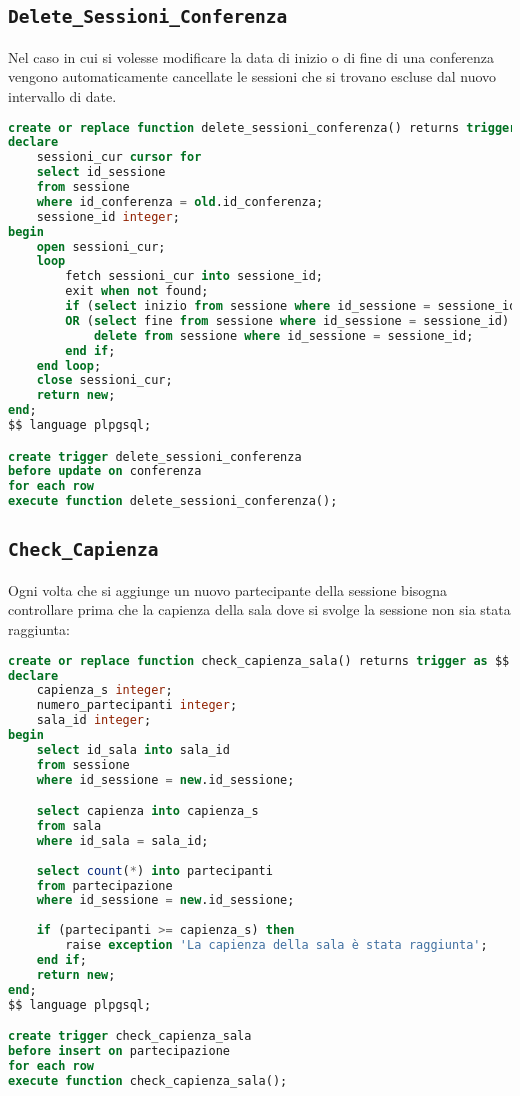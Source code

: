 \subsection{\texttt{Delete\_Sessioni\_Conferenza}}
Nel caso in cui si volesse modificare la data di inizio o di fine di una conferenza vengono automaticamente cancellate le sessioni che si trovano escluse dal nuovo intervallo di date.
\begin{lstlisting}[language=SQL, style=mystyle, caption={\texttt{Delete\_sessioni\_conferenza}}]
create or replace function delete_sessioni_conferenza() returns trigger as $$
declare
    sessioni_cur cursor for 
    select id_sessione 
    from sessione 
    where id_conferenza = old.id_conferenza;
    sessione_id integer;
begin
    open sessioni_cur;
    loop
        fetch sessioni_cur into sessione_id;
        exit when not found;
        if (select inizio from sessione where id_sessione = sessione_id) < new.inizio 
        OR (select fine from sessione where id_sessione = sessione_id) > new.fine then
            delete from sessione where id_sessione = sessione_id;
        end if;
    end loop;
    close sessioni_cur;
    return new;
end;
$$ language plpgsql;

create trigger delete_sessioni_conferenza
before update on conferenza
for each row
execute function delete_sessioni_conferenza();
\end{lstlisting}
\subsection{\texttt{Check\_Capienza}}\label{trigger:check_capienza}
Ogni volta che si aggiunge un nuovo partecipante della sessione bisogna controllare prima che la capienza della sala dove si svolge la sessione non sia stata raggiunta:
\begin{lstlisting}[language=SQL,caption={\texttt{Check\_Capienza}},style=mystyle]
create or replace function check_capienza_sala() returns trigger as $$
declare
    capienza_s integer;
    numero_partecipanti integer;
    sala_id integer;
begin
    select id_sala into sala_id
    from sessione
    where id_sessione = new.id_sessione;

    select capienza into capienza_s
    from sala
    where id_sala = sala_id;
    
    select count(*) into partecipanti
    from partecipazione
    where id_sessione = new.id_sessione;
    
    if (partecipanti >= capienza_s) then
        raise exception 'La capienza della sala è stata raggiunta';
    end if;
    return new;
end;
$$ language plpgsql;

create trigger check_capienza_sala
before insert on partecipazione
for each row
execute function check_capienza_sala();
\end{lstlisting}
